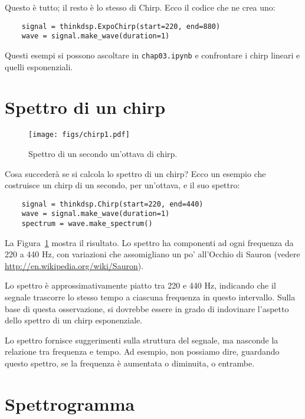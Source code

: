 \documentclass[12pt]{book} \usepackage[width=5.5in,height=8.5in, hmarginratio=3:2,vmarginratio=1:1]{geometry}
\begin{document}
Questo è tutto; il resto è lo stesso di Chirp. Ecco il codice che ne crea uno:

\begin{verbatim} 
    signal = thinkdsp.ExpoChirp(start=220, end=880)
    wave = signal.make_wave(duration=1)
 \end{verbatim} 

Questi esempi si possono ascoltare in {\tt chap03.ipynb} e confrontare i chirp lineari e quelli esponenziali.

\section{Spettro di un chirp} \label{sauron} 

\begin{figure} 

\centerline{\texttt{[image: figs/chirp1.pdf]}} \caption{Spettro di un secondo un'ottava di chirp.} \label{fig.chirp1} \end{figure} 

Cosa succederà se si calcola lo spettro di un chirp? Ecco un esempio che costruisce un chirp di un secondo, per un'ottava, e il suo spettro:

\begin{verbatim} 
    signal = thinkdsp.Chirp(start=220, end=440)
    wave = signal.make_wave(duration=1)
    spectrum = wave.make_spectrum()
 \end{verbatim} 

La Figura~\ref{fig.chirp1} mostra il risultato. Lo spettro ha componenti ad ogni frequenza da 220 a 440 Hz, con variazioni che assomigliano un po' all'Occhio di Sauron (vedere \url{http://en.wikipedia.org/wiki/Sauron}).

Lo spettro è approssimativamente piatto tra 220 e 440 Hz, indicando che il segnale trascorre lo stesso tempo a ciascuna frequenza in questo intervallo. Sulla base di questa osservazione, si dovrebbe essere in grado di indovinare l'aspetto dello spettro di un chirp esponenziale.

Lo spettro fornisce suggerimenti sulla struttura del segnale, ma nasconde la relazione tra frequenza e tempo. Ad esempio, non possiamo dire, guardando questo spettro, se la frequenza è aumentata o diminuita, o entrambe.

\section{Spettrogramma} 
\end{document}
